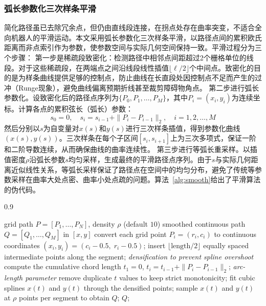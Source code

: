 \documentclass[lettersize,journal]{IEEEtran}
\begin{document}
\subsubsection{弧长参数化三次样条平滑}
简化路径虽已去除冗余点，但仍由直线段连接，在拐点处存在曲率突变，不适合全向机器人的平滑运动。本文采用弧长参数化三次样条平滑，以路径点间的累积欧氏距离而非点索引作为参数，使参数空间与实际几何空间保持一致。平滑过程分为三个步骤：
第一步是稀疏段致密化：检测路径中相邻点间距超过2个栅格单位的线段。对于这些稀疏段，在两端点之间沿线段线性插值$\lfloor \ell / 2 \rfloor$个中间点。致密化的目的是为样条曲线提供足够的控制点，防止曲线在长直段处因控制点不足而产生的过冲（Runge现象），避免曲线偏离预期折线甚至裁剪障碍物角点。
第二步进行弧长参数化。设致密化后的路径点序列为$\{P_0, P_1, \ldots, P_M\}$，其中$P_i = (x_i, y_i)$为连续坐标。计算各点的累积弦长（弧长）参数：
\begin{equation}
s_0 = 0, \quad s_i = s_{i-1} + \|P_i - P_{i-1}\|_2, \quad i = 1, 2, \ldots, M
\label{eq:arclen}
\end{equation}
然后分别以$s$为自变量对$x(s)$和$y(s)$进行三次样条插值，得到参数化曲线$(x(s), y(s))$。三次样条在每个子区间$[s_i, s_{i+1}]$上为三次多项式，保证一阶和二阶导数连续，从而确保曲线的曲率连续性。
第三步进行等弧长重采样。以插值密度$\rho$沿弧长参数$s$均匀采样，生成最终的平滑路径点序列。由于$s$与实际几何距离近似线性关系，等弧长采样保证了路径点在空间中的均匀分布，避免了传统等参数采样在曲率大处点密、曲率小处点疏的问题。算法~\textcolor{blue}{\ref{alg:smooth}}给出了平滑算法的伪代码。
\begin{algorithm}[!t]
\caption{Arc-length parameterized cubic spline smoothing}
\label{alg:smooth}
\begin{spacing}{0.9}
\begin{algorithmic}[1]
\REQUIRE grid path $P = [P_1, \ldots, P_N]$, density $\rho$ (default $10$)
\ENSURE smoothed continuous path $Q = [Q_1, \ldots, Q_M]$ in $[x, y]$
\STATE convert each grid point $P_i = (r_i, c_i)$ to continuous coordinates $(x_i, y_i) = (c_i - 0.5,\; r_i - 0.5)$;
\STATE insert $\lfloor \mathrm{length} / 2 \rfloor$ equally spaced intermediate points along the segment; \quad\textit{densification to prevent spline overshoot}
\ENDFOR
\STATE compute the cumulative chord length $t_1 = 0$, $t_i = t_{i-1} + \|P_i - P_{i-1}\|_2$; \quad\textit{arc-length parameter}
\STATE remove duplicate $t$ values to keep strict monotonicity;
\STATE fit cubic splines $x(t)$ and $y(t)$ through the densified points;
\STATE sample $x(t)$ and $y(t)$ at $\rho$ points per segment to obtain $Q$;
\RETURN $Q$;
\end{algorithmic}
\end{spacing}
\end{algorithm}
\end{document}
